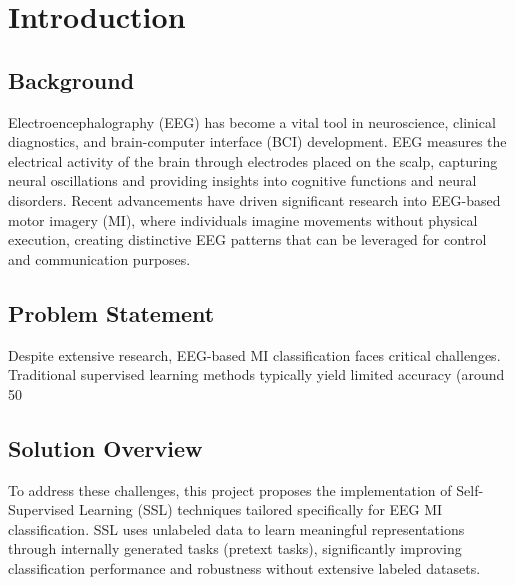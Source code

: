 \chapter{Introduction}
\label{chap:introduction}


\section{Background}
\label{section:background}


Electroencephalography (EEG) has become a vital tool in neuroscience, clinical diagnostics, and brain-computer interface (BCI) development. EEG measures the electrical activity of the brain through electrodes placed on the scalp, capturing neural oscillations and providing insights into cognitive functions and neural disorders. Recent advancements have driven significant research into EEG-based motor imagery (MI), where individuals imagine movements without physical execution, creating distinctive EEG patterns that can be leveraged for control and communication purposes.


\section{Problem Statement}
\label{section:problem-statement}


Despite extensive research, EEG-based MI classification faces critical challenges. Traditional supervised learning methods typically yield limited accuracy (around 50%


\section{Solution Overview}
\label{section:solution-overview}


To address these challenges, this project proposes the implementation of Self-Supervised Learning (SSL) techniques tailored specifically for EEG MI classification. SSL uses unlabeled data to learn meaningful representations through internally generated tasks (pretext tasks), significantly improving classification performance and robustness without extensive labeled datasets.

